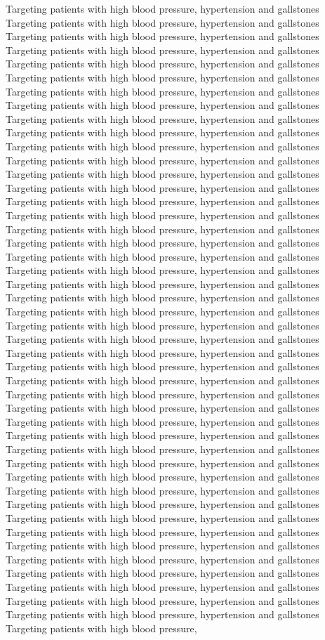 \documentclass{article}%
\begin{document}
{Targeting patients with high blood pressure, hypertension and gallstones Targeting patients with high blood pressure, hypertension and gallstones Targeting patients with high blood pressure, hypertension and gallstones Targeting patients with high blood pressure, hypertension and gallstones Targeting patients with high blood pressure, hypertension and gallstones Targeting patients with high blood pressure, hypertension and gallstones Targeting patients with high blood pressure, hypertension and gallstones Targeting patients with high blood pressure, hypertension and gallstones Targeting patients with high blood pressure, hypertension and gallstones Targeting patients with high blood pressure, hypertension and gallstones Targeting patients with high blood pressure, hypertension and gallstones Targeting patients with high blood pressure, hypertension and gallstones Targeting patients with high blood pressure, hypertension and gallstones Targeting patients with high blood pressure, hypertension and gallstones Targeting patients with high blood pressure, hypertension and gallstones Targeting patients with high blood pressure, hypertension and gallstones Targeting patients with high blood pressure, hypertension and gallstones Targeting patients with high blood pressure, hypertension and gallstones Targeting patients with high blood pressure, hypertension and gallstones Targeting patients with high blood pressure, hypertension and gallstones Targeting patients with high blood pressure, hypertension and gallstones Targeting patients with high blood pressure, hypertension and gallstones Targeting patients with high blood pressure, hypertension and gallstones Targeting patients with high blood pressure, hypertension and gallstones Targeting patients with high blood pressure, hypertension and gallstones Targeting patients with high blood pressure, hypertension and gallstones Targeting patients with high blood pressure, hypertension and gallstones Targeting patients with high blood pressure, hypertension and gallstones Targeting patients with high blood pressure, hypertension and gallstones Targeting patients with high blood pressure, hypertension and gallstones Targeting patients with high blood pressure, hypertension and gallstones Targeting patients with high blood pressure, hypertension and gallstones Targeting patients with high blood pressure, hypertension and gallstones Targeting patients with high blood pressure, hypertension and gallstones Targeting patients with high blood pressure, hypertension and gallstones Targeting patients with high blood pressure, hypertension and gallstones Targeting patients with high blood pressure, hypertension and gallstones Targeting patients with high blood pressure, hypertension and gallstones Targeting patients with high blood pressure, hypertension and gallstones Targeting patients with high blood pressure, hypertension and gallstones Targeting patients with high blood pressure, hypertension and gallstones Targeting patients with high blood pressure, hypertension and gallstones Targeting patients with high blood pressure, hypertension and gallstones Targeting patients with high blood pressure, hypertension and gallstones Targeting patients with high blood pressure, hypertension and gallstones Targeting patients with high blood pressure, }
\end{document}
